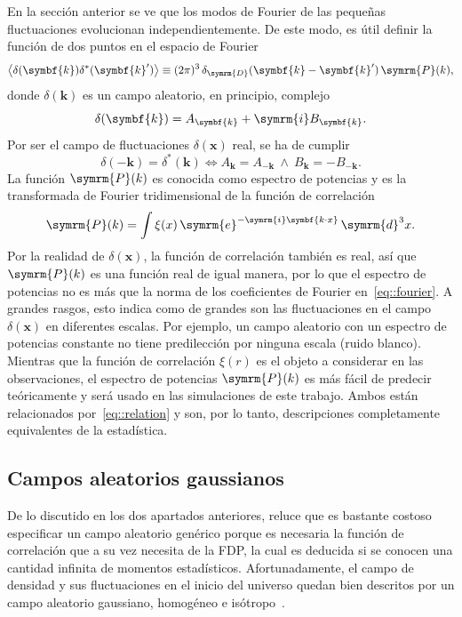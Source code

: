 En la sección anterior se ve que los modos de Fourier de las pequeñas fluctuaciones evolucionan independientemente. De este modo, es útil definir la función de dos puntos en el espacio de Fourier
\begin{equation}
    \left\langle\delta(\symbf{k})\delta^{*}(\symbf{k}')\right\rangle\equiv (2\pi)^3\,\delta_{\symrm{D}}(\symbf{k}-\symbf{k}')\,\symrm{P}(k),
\end{equation}
donde \(\delta(\symbf{k})\) es un campo aleatorio, en principio, complejo
\begin{equation}
    \delta(\symbf{k})=A_{\symbf{k}}+\symrm{i}B_{\symbf{k}}.\label{eq::deltak}
\end{equation}
Por ser el campo de fluctuaciones \(\delta(\symbf{x})\) real, se ha de cumplir
\begin{equation}
    \delta(\symbf{-k})=\delta^{*}(\symbf{k})\Longleftrightarrow A_{\symbf{k}}=A_{-{\symbf{k}}}\ \wedge\ B_{\symbf{k}}=-B_{-{\symbf{k}}}.\label{eq::reality}
\end{equation}
La función \(\symrm{P}(k)\) es conocida como espectro de potencias y es la transformada de Fourier tridimensional de la función de correlación
\begin{equation}
    \symrm{P}(k)=\int\xi(x)\,\symrm{e}^{-\symrm{i}\symbf{k\cdot x}}\,\symrm{d}^3x.\label{eq::relation}
\end{equation}
Por la realidad de \(\delta(\symbf{x})\), la función de correlación también	es real, así que \(\symrm{P}(k)\) es una función real de igual manera, por lo que el espectro de potencias no es más que la norma de los coeficientes de Fourier en~\ref{eq::fourier}. A grandes rasgos, esto indica como de grandes son las fluctuaciones en el campo \(\delta(\symbf{x})\) en diferentes escalas. Por ejemplo, un campo aleatorio con un espectro de potencias constante no tiene predilección por ninguna escala (ruido blanco). Mientras que la función de correlación \(\xi(r)\) es el objeto a considerar en las observaciones, el espectro de potencias \(\symrm{P}(k)\) es más fácil de predecir teóricamente y será usado en las simulaciones de este trabajo. Ambos están relacionados por~\ref{eq::relation} y son, por lo tanto, descripciones completamente equivalentes de la estadística.
\subsection{Campos aleatorios gaussianos}
De lo discutido en los dos apartados anteriores, reluce que es bastante costoso especificar un campo aleatorio genérico porque es necesaria la función de correlación que a su vez necesita de la FDP, la cual es deducida si se conocen una cantidad infinita de momentos estadísticos. Afortunadamente, el campo de densidad y sus fluctuaciones en el inicio del universo quedan bien descritos por un campo aleatorio gaussiano, homogéneo e isótropo~\cite{baumann2022cosmology, dodelson2020modern,mo_van}.


